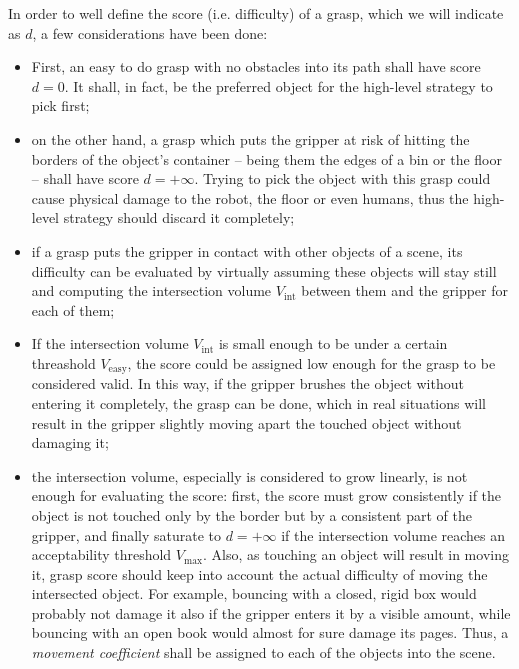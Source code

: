 In order to well define the score (i.e. difficulty) of a grasp, which we will
indicate as $d$, a few
considerations have been done:
\begin{itemize}
  \item{First, an easy to do grasp with no obstacles
      into its path shall have score $d=0$. It shall, in fact, be  the preferred
    object for the high-level strategy to pick first;}
  \item{on the other hand, a grasp which puts the
      gripper at risk of hitting the borders of the object's container -- being them
      the edges of a bin or the floor -- shall have score $d=+\infty$. Trying to pick the
      object with this grasp could cause physical damage to the robot, the floor or
    even humans, thus the high-level strategy should discard it completely;}
  \item{if a grasp puts the gripper in contact with other objects of a scene, its
      difficulty can be evaluated by virtually assuming these objects will stay still and
      computing the intersection volume $V_{\text{int}}$ between them and the
      gripper for each of them;}
    \item{If the intersection volume $V_{\text{int}}$ is small enough to be
        under a certain threashold $V_{\text{easy}}$, the score could be assigned low enough for the
      grasp to be considered valid. In this way, if the gripper brushes the object
      without entering it completely, the grasp can be done, which in real situations
      will result in the gripper slightly moving apart the touched object without
    damaging it; }
  \item{the intersection volume, especially is considered to grow linearly, is not
      enough for evaluating the score: first, the score must grow consistently if the
      object is not touched only by the border but by a consistent part of the
      gripper, and finally saturate to $d=+\infty$ if the intersection volume
      reaches an acceptability threshold $V_{\text{max}}$. Also, as touching an object will result in moving it, grasp score
      should keep into account the actual difficulty of moving the intersected
      object. For example, bouncing with a closed, rigid box would probably not damage it
      also if the gripper enters it by a visible amount, while bouncing with an
      open book would almost for sure damage its pages. Thus, a \emph{movement
    coefficient} shall be assigned to each of the objects into the scene.}
\end{itemize}


